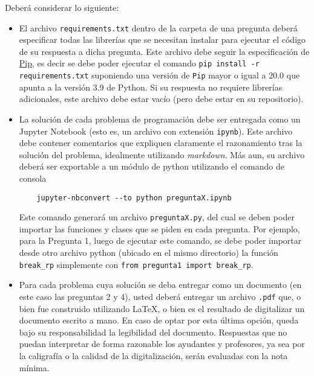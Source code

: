 \bigskip

Deberá considerar lo siguiente:

\begin{itemize}

  \item El archivo \texttt{requirements.txt} dentro de la carpeta de una pregunta deberá especificar todas las librerías que se necesitan instalar para ejecutar el código de su respuesta a dicha pregunta. Este archivo debe seguir la especificación de \href{https://pypi.org/project/pip/}{Pip}, es decir se debe poder ejecutar el comando \texttt{pip install -r requirements.txt} suponiendo una versión de \texttt{Pip} mayor o igual a 20.0 que apunta a la versión 3.9 de Python. Si su respuesta no requiere librerías adicionales, este archivo debe estar vacío (pero debe estar en su repositorio).

\item La solución de cada problema de programación debe ser entregada como un Jupyter Notebook (esto es, un archivo con extensión \texttt{ipynb}). Este archivo debe contener comentarios que expliquen claramente el razonamiento tras la solución del problema, idealmente utilizando \emph{markdown}. Más aun, su archivo deberá ser exportable a un módulo de python utilizando el comando de consola
\begin{verbatim}
    jupyter-nbconvert --to python preguntaX.ipynb
\end{verbatim}
Este comando generará un archivo \texttt{preguntaX.py}, del cual se deben poder importar las funciones y clases que se piden en cada pregunta. Por ejemplo, para la Pregunta 1, luego de ejecutar este comando, se debe poder importar desde otro archivo python (ubicado en el mismo directorio) la función \texttt{break\_rp} simplemente con \texttt{from pregunta1 import break\_rp}.

\item Para cada problema cuya solución se deba entregar como un documento (en este caso las preguntas 2 y 4), usted deberá entregar un archivo \texttt{.pdf} que, o bien fue construido utilizando \LaTeX, o bien es el resultado de digitalizar un documento escrito a mano. En caso de optar por esta última opción, queda bajo su responsabilidad la legibilidad del documento. Respuestas que no puedan interpretar de forma razonable los ayudantes y profesores, ya sea por la caligrafía o la calidad de la digitalización, serán evaluadas con la nota mínima.

\end{itemize}
